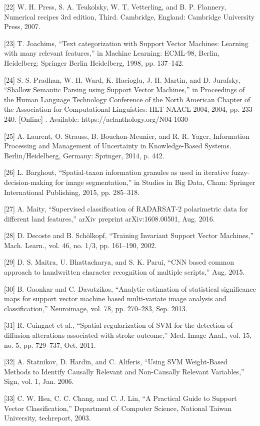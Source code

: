 \documentclass[sn-mathphys-num]{sn-jnl}%
\begin{document}
[22] W. H. Press, S. A. Teukolsky, W. T. Vetterling, and B. P. Flannery, Numerical recipes 3rd edition, Third. Cambridge, England: Cambridge University Press, 2007.

[23] T. Joachims, “Text categorization with Support Vector Machines: Learning with many relevant features,” in Machine Learning: ECML-98, Berlin, Heidelberg: Springer Berlin Heidelberg, 1998, pp. 137–142.

[24] S. S. Pradhan, W. H. Ward, K. Hacioglu, J. H. Martin, and D. Jurafsky, “Shallow Semantic Parsing using Support Vector Machines,” in Proceedings of the Human Language Technology Conference of the North American Chapter of the Association for Computational Linguistics: HLT-NAACL 2004, 2004, pp. 233–240. [Online] . Available: https://aclanthology.org/N04-1030

[25] A. Laurent, O. Strauss, B. Bouchon-Meunier, and R. R. Yager, Information Processing and Management of Uncertainty in Knowledge-Based Systems. Berlin/Heidelberg, Germany: Springer, 2014, p. 442.

[26] L. Barghout, “Spatial-taxon information granules as used in iterative fuzzy-decision-making for image segmentation,” in Studies in Big Data, Cham: Springer International Publishing, 2015, pp. 285–318.

[27] A. Maity, “Supervised classification of RADARSAT-2 polarimetric data for different land features,” arXiv preprint arXiv:1608.00501, Aug. 2016.

[28] D. Decoste and B. Schölkopf, “Training Invariant Support Vector Machines,” Mach. Learn., vol. 46, no. 1/3, pp. 161–190, 2002.

[29] D. S. Maitra, U. Bhattacharya, and S. K. Parui, “CNN based common approach to handwritten character recognition of multiple scripts,” Aug. 2015.

[30] B. Gaonkar and C. Davatzikos, “Analytic estimation of statistical significance maps for support vector machine based multi-variate image analysis and classification,” Neuroimage, vol. 78, pp. 270–283, Sep. 2013.

[31] R. Cuingnet et al., “Spatial regularization of SVM for the detection of diffusion alterations associated with stroke outcome,” Med. Image Anal., vol. 15, no. 5, pp. 729–737, Oct. 2011.

[32] A. Statnikov, D. Hardin, and C. Aliferis, “Using SVM Weight-Based Methods to Identify Causally Relevant and Non-Causally Relevant Variables,” Sign, vol. 1, Jan. 2006.

[33] C. W. Hsu, C. C. Chang, and C. J. Lin, “A Practical Guide to Support Vector Classification,” Department of Computer Science, National Taiwan University, techreport, 2003.
\end{document}
